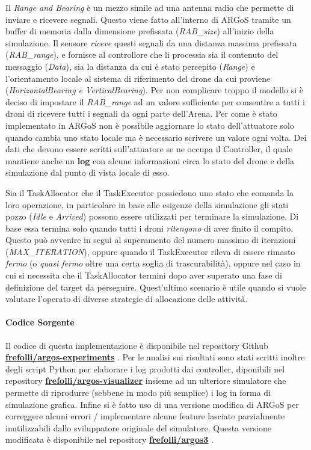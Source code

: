 \documentclass[a4paper,11pt,oneside, table]{article}
\begin{document}
Il \textit{Range and Bearing} \`e un mezzo simile ad una antenna radio che permette di inviare e ricevere segnali. Questo viene fatto all'interno di ARGoS tramite un buffer di memoria dalla dimensione prefissata (\textit{RAB\_size}) all'inizio della simulazione.
Il sensore \textit{riceve} questi segnali da una distanza massima prefissata (\textit{RAB\_range}), e fornisce al controllore che li processia sia il contenuto del messaggio (\textit{Data}), sia la distanza da cui \`e stato percepito (\textit{Range}) e l'orientamento locale al sistema di riferimento del drone da cui proviene (\textit{HorizontalBearing e VerticalBearing}).
Per non complicare troppo il modello si \`e deciso di impostare il \textit{RAB\_range} ad un valore sufficiente per consentire a tutti i droni di ricevere tutti i segnali da ogni parte dell'Arena.
Per come \`e stato implementato in ARGoS non \`e possibile aggiornare lo stato dell'attuatore solo quando cambia uno stato locale ma \`e necessario scrivere un valore ogni volta. %
Dei dati che devono essere scritti sull'attuatore se ne occupa il Controller, il quale mantiene anche un \textbf{log} con alcune informazioni circa lo stato del drone e della simulazione dal punto di vista locale di esso.

Sia il TaskAllocator che il TaskExecutor possiedono uno stato che comanda la loro operazione, in particolare in base alle esigenze della simulazione gli stati pozzo (\textit{Idle} e \textit{Arrived}) possono essere utilizzati per terminare la simulazione.
Di base essa termina solo quando tutti i droni \textit{ritengono} di aver finito il compito. Questo pu\`o avvenire in segui al superamento del numero massimo di iterazioni (\textit{MAX\_ITERATION}), oppure quando il TaskExecutor rileva di essere rimasto \textit{fermo} (o \textit{quasi fermo} oltre una certa soglia di trascurabilit\`a), oppure nel caso in cui si necessita che il TaskAllocator termini dopo aver superato una fase di definizione del target da perseguire.
Quest'ultimo scenario \`e utile quando si vuole valutare l'operato di diverse strategie di allocazione delle attivit\`a.

\paragraph{Codice Sorgente}

Il codice di questa implementazione \`e disponibile nel repository Github \textbf{\href{http://github.com/frefolli/argos-experiments}{frefolli/argos-experiments}} \cite{RF:AE}.
Per le analisi sui risultati sono stati scritti inoltre degli script Python per elaborare i log prodotti dai controller, diponibili nel repository \textbf{\href{http://github.com/frefolli/argos-visualizer}{frefolli/argos-visualizer}} \cite{RF:AV} insieme ad un ulteriore simulatore che permette di riprodurre (sebbene in modo pi\`u semplice) i log in forma di simulazione grafica.
Infine si \`e fatto uso di una versione modifica di ARGoS per correggere alcuni errori / implementare alcune feature lasciate parzialmente inutilizzabili dallo sviluppatore originale del simulatore. Questa versione modificata \`e disponibile nel repository \textbf{\href{http://github.com/frefolli/argos3}{frefolli/argos3}} \cite{RF:A3}.
\end{document}
